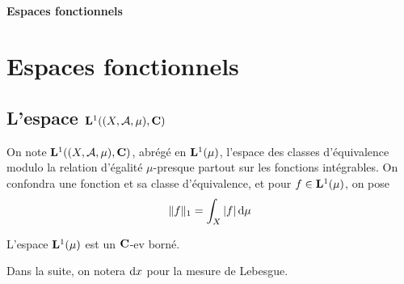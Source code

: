 \ifsolo
    ~

    \vspace{1cm}

    \begin{center}
        \textbf{\LARGE Espaces fonctionnels} \\[1em]
    \end{center}
    \tableofcontents
\else
    \chapter{Espaces fonctionnels}

    \minitoc
\fi
\thispagestyle{empty}

\section{L'espace \texorpdfstring{$\mathbf L^1((X, \mathcal  A, \mu), \mathbf C)$ }{L1((X, A, mu), C)}}

\begin{dfn}
    On note $\mathbf L^1((X, \mathcal  A, \mu), \mathbf C)$, abrégé en $\mathbf L^1(\mu)$, l'espace des classes d'équivalence modulo la relation d'égalité  $\mu$-presque partout sur les fonctions intégrables. On confondra une fonction et sa classe d'équivalence, et pour  $f \in \mathbf L^1(\mu)$, on pose \[
    \|f\|_1=\int_X|f|\mathop{}\!\mathrm d\mu
    \] 
\end{dfn}

\begin{rem}
    L'espace $\mathbf L^1(\mu)$ est un  $ \mathbf C$-ev borné.
\end{rem}


\begin{rem}
Dans la suite, on notera $\mathop{}\!\mathrm d x$ pour la mesure de Lebesgue.
\end{rem}


